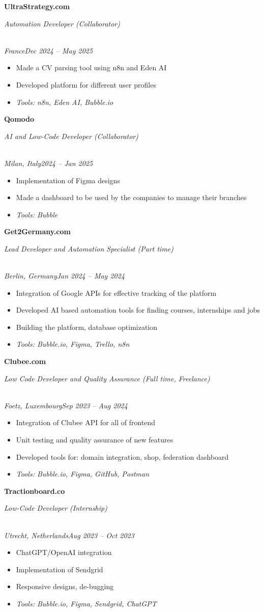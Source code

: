 \documentclass[a4paper,10pt]{article}
\newcommand{\role}[4]{\vspace{3pt}\noindent\hspace{0.6em}\parbox[t]{0.38\textwidth}{\raggedright\textbf{#1}}\hfill\parbox[t]{0.58\textwidth}{\raggedleft\textit{#2}}\\{\textit{#3}\hfill\textit{#4}}\vspace{1pt}}
\begin{document}
\role{UltraStrategy.com}{Automation Developer (Collaborator)}{France}{Dec 2024 -- May 2025}
\begin{itemize}
\item Made a CV parsing tool using n8n and Eden AI
\item Developed platform for different user profiles
\item \textit{Tools: n8n, Eden AI, Bubble.io}
\end{itemize}

\role{Qomodo}{AI and Low-Code Developer (Collaborator)}{Milan, Italy}{2024 -- Jan 2025}
\begin{itemize}
\item Implementation of Figma designs
\item Made a dashboard to be used by the companies to manage their branches
\item \textit{Tools: Bubble}
\end{itemize}

\role{Get2Germany.com}{Lead Developer and Automation Specialist (Part time)}{Berlin, Germany}{Jan 2024 -- May 2024}
\begin{itemize}
\item Integration of Google APIs for effective tracking of the platform
\item Developed AI based automation tools for finding courses, internships and jobs
\item Building the platform, database optimization
\item \textit{Tools: Bubble.io, Figma, Trello, n8n}
\end{itemize}

\role{Clubee.com}{Low Code Developer and Quality Assurance (Full time, Freelance)}{Foetz, Luxembourg}{Sep 2023 -- Aug 2024}
\begin{itemize}
\item Integration of Clubee API for all of frontend
\item Unit testing and quality assurance of new features
\item Developed tools for: domain integration, shop, federation dashboard
\item \textit{Tools: Bubble.io, Figma, GitHub, Postman}
\end{itemize}

\role{Tractionboard.co}{Low-Code Developer (Internship)}{Utrecht, Netherlands}{Aug 2023 -- Oct 2023}
\begin{itemize}
\item ChatGPT/OpenAI integration
\item Implementation of Sendgrid
\item Responsive designs, de-bugging
\item \textit{Tools: Bubble.io, Figma, Sendgrid, ChatGPT}
\end{itemize}
\end{document}

